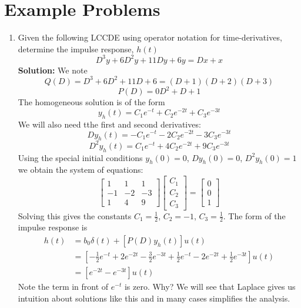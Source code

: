 \documentclass{article}
\begin{document}
\section{Example Problems}

\begin{enumerate}
\item Given the following LCCDE using operator notation for time-derivatives, determine the impulse response, $h(t)$
  \begin{equation}
    D^3y + 6D^2y + 11Dy + 6y = Dx + x
  \end{equation}
  \textbf{Solution:} We note
  \[
  Q(D) = D^3 + 6D^2 + 11D + 6 = (D+1)(D+2)(D+3)
  \]
  \[
  P(D) = 0D^2 + D + 1
  \]
  The homogeneous solution is of the form
  \[
  y_h(t) = C_1e^{-t} + C_2e^{-2t} + C_3e^{-3t}
  \]
  We will also need tthe first and second derivatives:
  \[
  D y_h(t) = -C_1e^{-t} -2 C_2e^{-2t} -3 C_3e^{-3t}
  \]
  \[
  D^2 y_h(t) = C_1e^{-t} +4C_2e^{-2t} +9 C_3e^{-3t}
  \]
  Using the special initial conditions $y_h(0) = 0$, $D y_h(0) = 0$, $D^2 y_h(0) = 1$ we obtain the system of equations:
  \[
  \begin{bmatrix}
    1  & 1  & 1  \\
    -1 & -2 & -3 \\
    1  & 4  & 9
  \end{bmatrix}
  \begin{bmatrix}
    C_1 \\ C_2 \\ C_3
  \end{bmatrix}
  =
  \begin{bmatrix}
    0 \\ 0 \\ 1
  \end{bmatrix}
  \]
  Solving this gives the constants $C_1 = \frac{1}{2}$, $C_2 = -1$, $C_3 = \frac{1}{2}$. The form of the impulse response is
  \begin{align}
    h(t) & = b_0\delta(t) + \left[ P(D) y_h(t) \right] u(t)                                                                             \\
    & = \left[-\frac{1}{2} e^{-t} + 2e^{-2t} - \frac{3}{2}e^{-3t} + \frac{1}{2}e^{-t} - 2e^{-2t} + \frac{1}{2}e^{-3t} \right] u(t) \\
    & = \left[e^{-2t} - e^{-3t}\right] u(t)
  \end{align}
  Note the term in front of $e^{-t}$ is zero. Why? We will see that Laplace gives us intuition about solutions like this and in many cases simplifies the analysis.


\end{enumerate}
\end{document}
